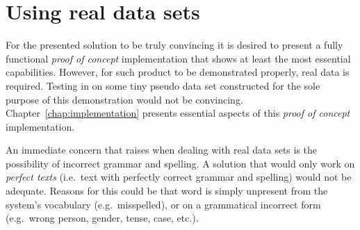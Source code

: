 \section{Using real data sets}
\label{sec:realData}

For the presented solution to be truly convincing it is desired to present a fully functional \emph{proof of concept} implementation that shows at least the most essential capabilities. However, for such product to be demonstrated properly, real data is required. Testing in on some tiny pseudo data set constructed for the sole purpose of this demonstration would not be convincing. Chapter~\ref{chap:implementation} presents essential aspects of this \emph{proof of concept} implementation. 

An immediate concern that raises when dealing with real data sets is the possibility of incorrect grammar and spelling. A solution that would only work on \emph{perfect texts} (i.e.\ text with perfectly correct grammar and spelling) would not be adequate. %
Reasons for this could be that word is simply unpresent from the system's vocabulary (e.g.\ misspelled), or on a grammatical incorrect form (e.g.\ wrong person, gender, tense, case, etc.). 




